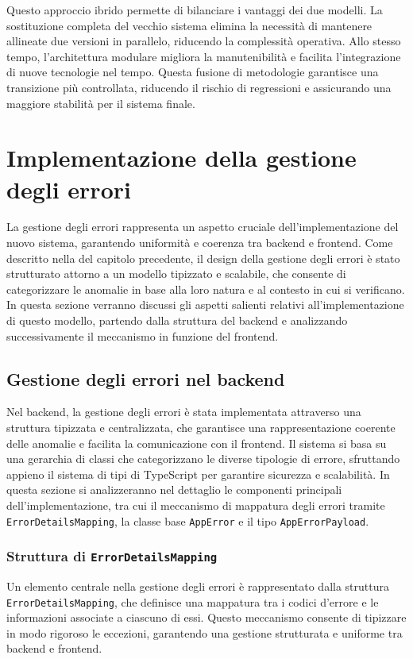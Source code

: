 Questo approccio ibrido permette di bilanciare i vantaggi dei due modelli. La sostituzione completa del vecchio sistema elimina la necessità di mantenere allineate due versioni in parallelo, riducendo la complessità operativa. Allo stesso tempo, l'architettura modulare migliora la manutenibilità e facilita l'integrazione di nuove tecnologie nel tempo. Questa fusione di metodologie garantisce una transizione più controllata, riducendo il rischio di regressioni e assicurando una maggiore stabilità per il sistema finale.

\section{Implementazione della gestione degli errori}
La gestione degli errori rappresenta un aspetto cruciale dell’implementazione del nuovo sistema, garantendo uniformità e coerenza tra backend e frontend. Come descritto nella  del capitolo precedente, il design della gestione degli errori è stato strutturato attorno a un modello tipizzato e scalabile, che consente di categorizzare le anomalie in base alla loro natura e al contesto in cui si verificano. In questa sezione verranno discussi gli aspetti salienti relativi all'implementazione di questo modello, partendo dalla struttura del backend e analizzando successivamente il meccanismo in funzione del frontend.

\subsection{Gestione degli errori nel backend}
Nel backend, la gestione degli errori è stata implementata attraverso una struttura tipizzata e centralizzata, che garantisce una rappresentazione coerente delle anomalie e facilita la comunicazione con il frontend. Il sistema si basa su una gerarchia di classi che categorizzano le diverse tipologie di errore, sfruttando appieno il sistema di tipi di TypeScript per garantire sicurezza e scalabilità. In questa sezione si analizzeranno nel dettaglio le componenti principali dell’implementazione, tra cui il meccanismo di mappatura degli errori tramite \texttt{ErrorDetailsMapping}, la classe base \texttt{AppError} e il tipo \texttt{AppErrorPayload}.

\subsubsection{Struttura di \texttt{ErrorDetailsMapping}}
Un elemento centrale nella gestione degli errori è rappresentato dalla struttura \texttt{ErrorDetailsMapping}, che definisce una mappatura tra i codici d’errore e le informazioni associate a ciascuno di essi. Questo meccanismo consente di tipizzare in modo rigoroso le eccezioni, garantendo una gestione strutturata e uniforme tra backend e frontend.

